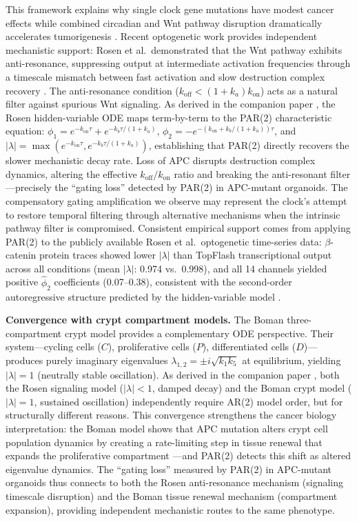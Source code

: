 \documentclass[11pt,letterpaper]{article}
\begin{document}
This framework explains why single clock gene mutations have modest cancer effects while combined circadian and Wnt pathway disruption dramatically accelerates tumorigenesis \citep{chun2022}. Recent optogenetic work provides independent mechanistic support: Rosen et al.\ demonstrated that the Wnt pathway exhibits anti-resonance, suppressing output at intermediate activation frequencies through a timescale mismatch between fast activation and slow destruction complex recovery \citep{rosen2026}. The anti-resonance condition ($k_{\text{off}} < (1 + k_a) k_{\text{on}}$) acts as a natural filter against spurious Wnt signaling. As derived in the companion paper \citep{whiteside2026method}, the Rosen hidden-variable ODE maps term-by-term to the PAR(2) characteristic equation: $\phi_1 = e^{-k_{\text{on}}\tau} + e^{-k_b\tau/(1+k_a)}$, $\phi_2 = -e^{-(k_{\text{on}} + k_b/(1+k_a))\tau}$, and $|\lambda| = \max(e^{-k_{\text{on}}\tau}, e^{-k_b\tau/(1+k_a)})$, establishing that PAR(2) directly recovers the slower mechanistic decay rate. Loss of APC disrupts destruction complex dynamics, altering the effective $k_{\text{off}}/k_{\text{on}}$ ratio and breaking the anti-resonant filter---precisely the ``gating loss'' detected by PAR(2) in APC-mutant organoids. The compensatory gating amplification we observe may represent the clock's attempt to restore temporal filtering through alternative mechanisms when the intrinsic pathway filter is compromised. Consistent empirical support comes from applying PAR(2) to the publicly available Rosen et al.\ optogenetic time-series data: $\beta$-catenin protein traces showed lower $|\lambda|$ than TopFlash transcriptional output across all conditions (mean $|\lambda|$: 0.974 vs.\ 0.998), and all 14 channels yielded positive $\hat{\phi}_2$ coefficients (0.07--0.38), consistent with the second-order autoregressive structure predicted by the hidden-variable model \citep{rosen2026}.

\textbf{Convergence with crypt compartment models.} The Boman three-compartment crypt model \citep{boman2025} provides a complementary ODE perspective. Their system---cycling cells ($C$), proliferative cells ($P$), differentiated cells ($D$)---produces purely imaginary eigenvalues $\lambda_{1,2} = \pm i\sqrt{k_1 k_5}$ at equilibrium, yielding $|\lambda| = 1$ (neutrally stable oscillation). As derived in the companion paper \citep{whiteside2026method}, both the Rosen signaling model ($|\lambda| < 1$, damped decay) and the Boman crypt model ($|\lambda| = 1$, sustained oscillation) independently require AR(2) model order, but for structurally different reasons. This convergence strengthens the cancer biology interpretation: the Boman model shows that APC mutation alters crypt cell population dynamics by creating a rate-limiting step in tissue renewal that expands the proliferative compartment \citep{boman2025}---and PAR(2) detects this shift as altered eigenvalue dynamics. The ``gating loss'' measured by PAR(2) in APC-mutant organoids thus connects to both the Rosen anti-resonance mechanism (signaling timescale disruption) and the Boman tissue renewal mechanism (compartment expansion), providing independent mechanistic routes to the same phenotype.
\end{document}
